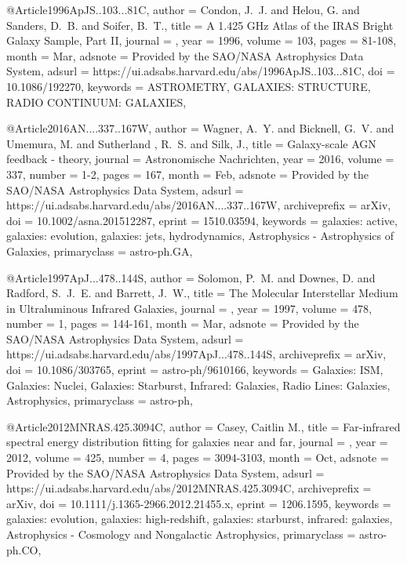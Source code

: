 \documentclass[longauth]{aa}
\begin{document}
{{{{@Article{1996ApJS..103...81C,
  author   = {{Condon}, J.~J. and {Helou}, G. and {Sanders}, D.~B. and {Soifer}, B.~T.},
  title    = {A 1.425 GHz Atlas of the IRAS Bright Galaxy Sample, Part II},
  journal  = {\apjs},
  year     = {1996},
  volume   = {103},
  pages    = {81-108},
  month    = {Mar},
  adsnote  = {Provided by the SAO/NASA Astrophysics Data System},
  adsurl   = {https://ui.adsabs.harvard.edu/abs/1996ApJS..103...81C},
  doi      = {10.1086/192270},
  keywords = {ASTROMETRY, GALAXIES: STRUCTURE, RADIO CONTINUUM: GALAXIES},
}

@Article{2016AN....337..167W,
  author        = {{Wagner}, A.~Y. and {Bicknell}, G.~V. and {Umemura}, M. and {Sutherland }, R.~S. and {Silk}, J.},
  title         = {Galaxy-scale AGN feedback - theory},
  journal       = {Astronomische Nachrichten},
  year          = {2016},
  volume        = {337},
  number        = {1-2},
  pages         = {167},
  month         = {Feb},
  adsnote       = {Provided by the SAO/NASA Astrophysics Data System},
  adsurl        = {https://ui.adsabs.harvard.edu/abs/2016AN....337..167W},
  archiveprefix = {arXiv},
  doi           = {10.1002/asna.201512287},
  eprint        = {1510.03594},
  keywords      = {galaxies: active, galaxies: evolution, galaxies: jets, hydrodynamics, Astrophysics - Astrophysics of Galaxies},
  primaryclass  = {astro-ph.GA},
}

@Article{1997ApJ...478..144S,
  author        = {{Solomon}, P.~M. and {Downes}, D. and {Radford}, S.~J.~E. and {Barrett}, J.~W.},
  title         = {The Molecular Interstellar Medium in Ultraluminous Infrared Galaxies},
  journal       = {\apj},
  year          = {1997},
  volume        = {478},
  number        = {1},
  pages         = {144-161},
  month         = {Mar},
  adsnote       = {Provided by the SAO/NASA Astrophysics Data System},
  adsurl        = {https://ui.adsabs.harvard.edu/abs/1997ApJ...478..144S},
  archiveprefix = {arXiv},
  doi           = {10.1086/303765},
  eprint        = {astro-ph/9610166},
  keywords      = {Galaxies: ISM, Galaxies: Nuclei, Galaxies: Starburst, Infrared: Galaxies, Radio Lines: Galaxies, Astrophysics},
  primaryclass  = {astro-ph},
}

@Article{2012MNRAS.425.3094C,
  author        = {{Casey}, Caitlin M.},
  title         = {Far-infrared spectral energy distribution fitting for galaxies near and far},
  journal       = {\mnras},
  year          = {2012},
  volume        = {425},
  number        = {4},
  pages         = {3094-3103},
  month         = {Oct},
  adsnote       = {Provided by the SAO/NASA Astrophysics Data System},
  adsurl        = {https://ui.adsabs.harvard.edu/abs/2012MNRAS.425.3094C},
  archiveprefix = {arXiv},
  doi           = {10.1111/j.1365-2966.2012.21455.x},
  eprint        = {1206.1595},
  keywords      = {galaxies: evolution, galaxies: high-redshift, galaxies: starburst, infrared: galaxies, Astrophysics - Cosmology and Nongalactic Astrophysics},
  primaryclass  = {astro-ph.CO},
}

}}}}
\end{document}
